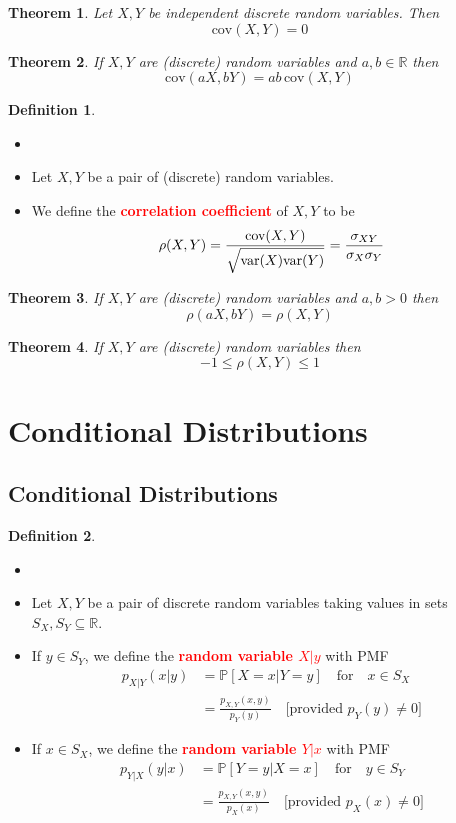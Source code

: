\documentclass{article}
\newcommand{\PP}{\mathbb{P}}
\newcommand{\R}{\mathbb{R}}
\newcommand{\var}{\text{var}}
\newcommand{\cov}{\text{cov}}
\newcommand{\bfred}[1]{\textcolor{red}{\textbf{#1}}}
\theoremstyle{plain}
\newtheorem{thm}{Theorem}[section]
\theoremstyle{definition}
\newtheorem{defn}{Definition}[section]
\theoremstyle{remark}
\begin{document}
\begin{thm}
    Let $X,Y$ be independent discrete random variables. Then \[\cov(X,Y)=0\]
\end{thm}

\begin{thm}
    If $X,Y$ are (discrete) random variables and $a,b\in\R$ then \[\cov(aX,bY)=ab\,\cov(X,Y)\]
\end{thm}

\begin{defn}
    \begin{itemize}
        \item []
        \item Let $X,Y$ be a pair of (discrete) random variables.
        \item We define the \bfred{correlation coefficient} of $X,Y$ to be \[\rho(X,Y)=\frac{\cov(X,Y)}{\sqrt{\var(X)\var(Y)\vphantom{\bigr\vert}}} = \frac{\sigma_{XY}}{\sigma_X\sigma_Y}\]
    \end{itemize}
\end{defn}

\begin{thm}
    If $X,Y$ are (discrete) random variables and $a,b>0$ then \[\rho(aX,bY)=\rho(X,Y)\]
\end{thm}

\begin{thm}
    If $X,Y$ are (discrete) random variables then \[-1\leq\rho(X,Y)\leq1\]
\end{thm}

\section{Conditional Distributions}

\subsection{Conditional Distributions}

\begin{defn}
    \begin{itemize}
        \item []
        \item Let $X,Y$ be a pair of discrete random variables taking values in sets $S_X,S_Y\subseteq\R$.
        \item If $y\in S_Y$, we define the \bfred{random variable $X|y$} with PMF
        \begin{align*}
            p_{X|Y}(x|y) &= \PP[X=x|Y=y]\quad\text{for}\quad x\in S_X \\
            &= \frac{p_{X,Y}(x,y)}{p_Y(y)}\quad\text{[provided $p_Y(y)\neq 0$]}
        \end{align*}
        \item If $x\in S_X$, we define the \bfred{random variable $Y|x$} with PMF
        \begin{align*}
            p_{Y|X}(y|x) &= \PP[Y=y|X=x]\quad\text{for}\quad y\in S_Y \\
            &= \frac{p_{X,Y}(x,y)}{p_X(x)}\quad\text{[provided $p_X(x)\neq 0$]}
        \end{align*}
    \end{itemize}
\end{defn}
\end{document}
